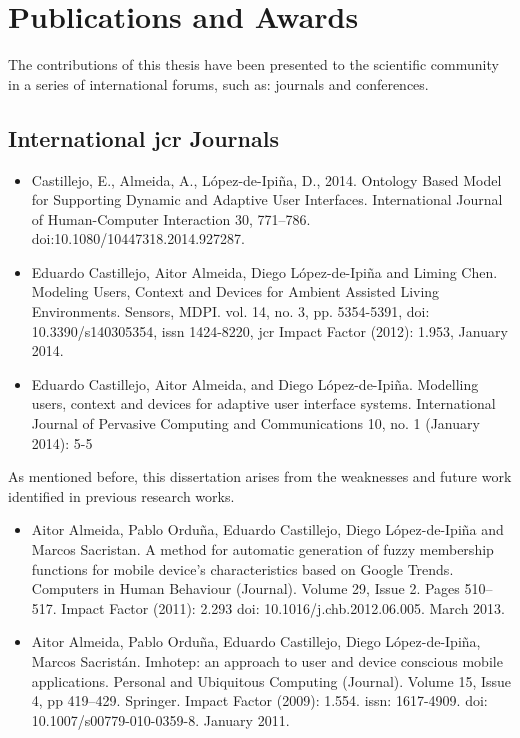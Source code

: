 \section{Publications and Awards}
\label{sec:publications}

The contributions of this thesis have been presented to the scientific community 
in a series of international forums, such as: journals and conferences.

\subsection{International \acs{jcr} Journals}


\begin{itemize}
  \item Castillejo, E., Almeida, A., {López-de-Ipiña}, D., 2014. Ontology Based 
  Model for Supporting Dynamic and Adaptive User Interfaces. International 
  Journal of Human-Computer Interaction 30, 771–786. 
  doi:10.1080/10447318.2014.927287.


  \item Eduardo Castillejo, Aitor Almeida, Diego {López-de-Ipiña} and Liming Chen. 
  Modeling Users, Context and Devices for Ambient Assisted Living 
  Environments. Sensors, MDPI. vol. 14, no. 3, pp. 5354-5391, \acs{doi}: 
  10.3390/s140305354, \acs{issn} 1424-8220, \acs{jcr} Impact Factor (2012): 1.953, 
  January 2014.
  
  \item Eduardo Castillejo, Aitor Almeida, and Diego {López-de-Ipiña}. Modelling 
  users, context and devices for adaptive user interface systems. International 
  Journal of Pervasive Computing and Communications 10, no. 1 (January 2014): 
  5-5
\end{itemize}
  
As mentioned before, this dissertation arises from the weaknesses and future work
identified in previous research works. 

\begin{itemize}
  \item Aitor Almeida, Pablo Orduña, Eduardo Castillejo, Diego {López-de-Ipiña} 
  and Marcos Sacristan. A method for automatic generation of fuzzy membership 
  functions for mobile device’s characteristics based on Google Trends. 
  Computers in Human Behaviour (Journal). Volume 29, Issue 2. Pages 510–517. 
  Impact Factor (2011): 2.293 \acs{doi}: 10.1016/j.chb.2012.06.005. March 2013.
  
  \item Aitor Almeida, Pablo Orduña, Eduardo Castillejo, Diego {López-de-Ipiña}, 
  Marcos Sacristán. Imhotep: an approach to user and device conscious mobile 
  applications. Personal and Ubiquitous Computing (Journal). Volume 15, Issue 
  4, pp 419–429. Springer. Impact Factor (2009): 1.554. \acs{issn}: 1617-4909. 
  \acs{doi}: 10.1007/s00779-010-0359-8. January 2011.
\end{itemize}


